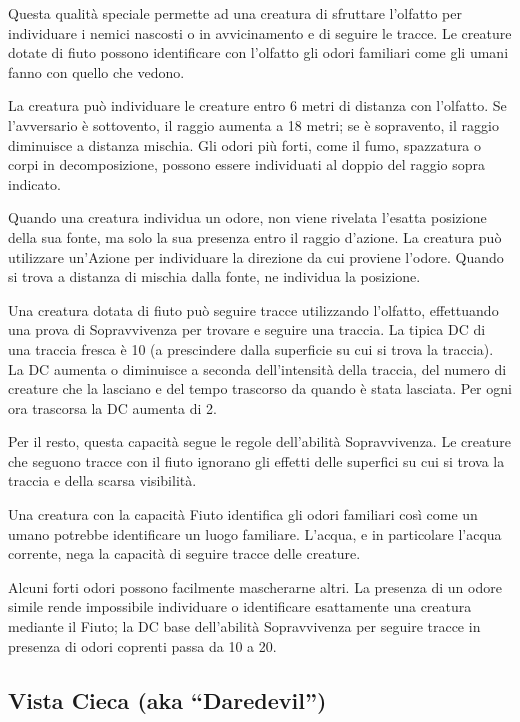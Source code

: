 \documentclass[a4paper,11pt,twoside,openany]{book}
\begin{document}
Questa qualità speciale permette ad una creatura di sfruttare l'olfatto per individuare i nemici nascosti o in avvicinamento e di seguire le tracce. Le creature dotate di fiuto possono identificare con l'olfatto gli odori familiari come gli umani fanno con quello che vedono.

La creatura può individuare le creature entro 6 metri di distanza con l'olfatto. Se l'avversario è sottovento, il raggio aumenta a 18 metri; se è sopravento, il raggio diminuisce a distanza mischia.
Gli odori più forti, come il fumo, spazzatura o corpi in decomposizione, possono essere individuati al doppio del raggio sopra indicato.

Quando una creatura individua un odore, non viene rivelata l'esatta posizione della sua fonte, ma solo la sua presenza entro il raggio d'azione. La creatura può utilizzare un'Azione per individuare la direzione da cui proviene l'odore. Quando si trova a distanza di mischia dalla fonte, ne individua la posizione.

Una creatura dotata di fiuto può seguire tracce utilizzando l'olfatto, effettuando una prova di Sopravvivenza per trovare e seguire una traccia. La tipica DC di una traccia fresca è 10 (a prescindere dalla superficie su cui si trova la traccia). La DC aumenta o diminuisce a seconda dell'intensità della traccia, del numero di creature che la lasciano e del tempo trascorso da quando è stata lasciata. Per ogni ora trascorsa la DC aumenta di 2.

Per il resto, questa capacità segue le regole dell'abilità Sopravvivenza. Le creature che seguono tracce con il fiuto ignorano gli effetti delle superfici su cui si trova la traccia e della scarsa visibilità.

Una creatura con la capacità Fiuto identifica gli odori familiari così come un umano potrebbe identificare un luogo familiare. L'acqua, e in particolare l'acqua corrente, nega la capacità di seguire tracce delle creature.

Alcuni forti odori possono facilmente mascherarne altri. La presenza di un odore simile rende impossibile individuare o identificare esattamente una creatura mediante il Fiuto; la DC base dell'abilità Sopravvivenza per seguire tracce in presenza di odori coprenti passa da 10 a 20.


\subsection{Vista Cieca (aka “Daredevil”)}
\end{document}
